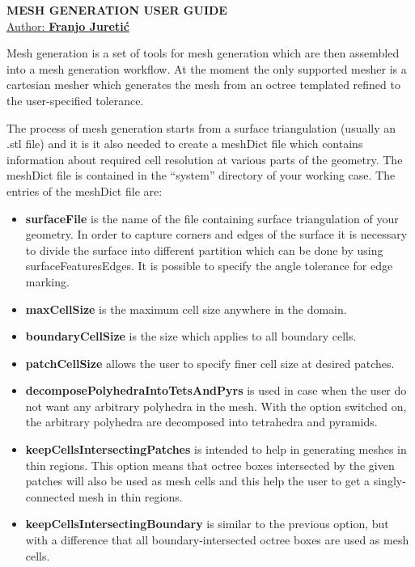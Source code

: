 \documentclass[11pt,a4paper,dvips,oneside]{article}
\begin{document}
\begin{center}
{\bf MESH GENERATION USER GUIDE} \\
\vspace{0.2in}
\uline{{\large Author: \bf Franjo Jureti\'{c}}}
\end{center}
%
\vspace{0.2in}
%
\begin{flushleft}
Mesh generation is a set of tools for mesh generation which are then assembled
into a mesh generation workflow. At the moment the only supported mesher is a
cartesian mesher which generates the mesh from an octree templated refined to
the user-specified tolerance.

The process of mesh generation starts from a surface triangulation (usually an
.stl file) and it is it also needed to create a meshDict file which contains
information about required cell resolution at various parts of the
geometry. The meshDict file is contained in the ``system'' directory of your
working case. The entries of the meshDict file are:
\begin{itemize}
\item {\bf surfaceFile} is the name of the file containing surface triangulation
  of your geometry. In order to capture corners and
  edges of the surface it is necessary to divide the surface into different
  partition which can be done by using surfaceFeaturesEdges. It is possible to
  specify the angle tolerance for edge marking.
\item {\bf maxCellSize} is the maximum cell size anywhere in the domain.
\item {\bf boundaryCellSize} is the size which applies to all boundary cells.
\item {\bf patchCellSize} allows the user to specify finer cell size at desired
  patches.
\item {\bf decomposePolyhedraIntoTetsAndPyrs} is used in case when the user do not want any arbitrary polyhedra in the mesh. With the option switched on, the arbitrary polyhedra are decomposed into tetrahedra and pyramids. 
\item {\bf keepCellsIntersectingPatches} is intended to help in generating
  meshes in thin regions. This option means that octree boxes intersected by the
  given patches will also be used as mesh cells and this help the user to get a
  singly-connected mesh in thin regions.
\item {\bf keepCellsIntersectingBoundary} is similar to the previous option, but
  with a difference that all boundary-intersected octree boxes are used as mesh cells.

\end{itemize}
\end{flushleft}
\end{document}

